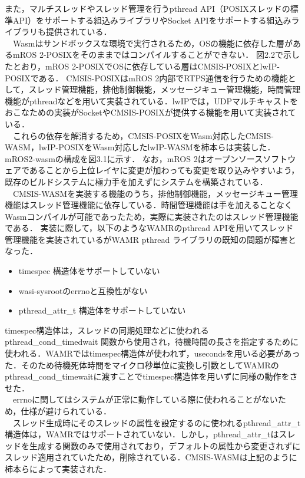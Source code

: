 また，マルチスレッドやスレッド管理を行うpthread API（POSIXスレッドの標準API）をサポートする組込みライブラリやSocket APIをサポートする組込みライブラリも提供されている．\\　Wasmはサンドボックスな環境で実行されるため，OSの機能に依存した層があるmROS 2-POSIXをそのままではコンパイルすることができない．
図2.2で示したとおり，mROS 2-POSIXでOSに依存している層はCMSIS-POSIXとlwIP-POSIXである．
CMSIS-POSIXはmROS 2内部でRTPS通信を行うための機能として，スレッド管理機能，排他制御機能，メッセージキュー管理機能，時間管理機能がpthreadなどを用いて実装されている．lwIPでは，UDPマルチキャストをおこなための実装がSocketやCMSIS-POSIXが提供する機能を用いて実装されている．
\\　これらの依存を解消するため，CMSIS-POSIXをWasm対応したCMSIS-WASM，lwIP-POSIXをWasm対応したlwIP-WASMを柿本らは実装した．
mROS2-wasmの構成を図3.1に示す．
なお，mROS 2はオープンソースソフトウェアであることから上位レイヤに変更が加わっても変更を取り込みやすいよう，既存のビルドシステムに極力手を加えずにシステムを構築されている．
\\　CMSIS-WASMを実装する機能のうち，排他制御機能，メッセージキュー管理機能はスレッド管理機能に依存している．時間管理機能は手を加えることなくWasmコンパイルが可能であったため，実際に実装されたのはスレッド管理機能である．
実装に際して，以下のようなWAMRのpthread APIを用いてスレッド管理機能を実装されているがWAMR pthread ライブラリの既知の問題が障害となった．
\begin{itemize}
    \item timespec 構造体をサポートしていない
    \item wasi-sysrootのerrnoと互換性がない
    \item pthread\_attr\_t 構造体をサポートしていない
\end{itemize}
timespec構造体は，スレッドの同期処理などに使われるpthread\_cond\_timedwait 関数から使用され，待機時間の長さを指定するために使われる．WAMRではtimespec構造体が使われず，usecondsを用いる必要があった．そのため待機死体時間をマイクロ秒単位に変換し引数としてWAMRのpthread\_cond\_timewaitに渡すことでtimespec構造体を用いずに同様の動作をさせた．
\\　errnoに関してはシステムが正常に動作している際に使われることがないため，仕様が避けられている．
\\　スレッド生成時にそのスレッドの属性を設定するのに使われるpthread\_attr\_t構造体は，WAMRではサポートされていない．しかし，pthread\_attr\_tはスレッドを生成する関数のみで使用されており，デフォルトの属性から変更されずにスレッド適用されていたため，削除されている．CMSIS-WASMは上記のように柿本らによって実装された．
